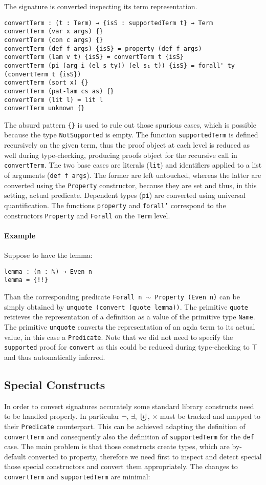 \documentclass[10pt,a4paper]{article}
\begin{document}
The signature is converted inspecting its term representation.
\begin{verbatim}
convertTerm : (t : Term) → {isS : supportedTerm t} → Term
convertTerm (var x args) {}
convertTerm (con c args) {}
convertTerm (def f args) {isS} = property (def f args)
convertTerm (lam v t) {isS} = convertTerm t {isS}
convertTerm (pi (arg i (el s ty)) (el s₁ t)) {isS} = forall' ty (convertTerm t {isS})
convertTerm (sort x) {}
convertTerm (pat-lam cs as) {}
convertTerm (lit l) = lit l
convertTerm unknown {}
\end{verbatim}
The absurd pattern \texttt{\{\}} is used to rule out those spurious cases, which is possible because the type \texttt{NotSupported} is empty.
The function \texttt{supportedTerm} is defined recursively on the given term, thus the proof object at each level is reduced as well during type-checking, producing proofs object for the recursive call in \texttt{convertTerm}. The two base cases are literals (\texttt{lit}) and identifiers applied to a list of arguments (\texttt{def f args}). The former are left untouched, whereas the latter are converted using the \texttt{Property} constructor, because they are set and thus, in this setting, actual predicate.
Dependent types (\texttt{pi}) are converted using universal quantification.
The functions \texttt{property} and \texttt{forall'} correspond to the constructors \texttt{Property} and \texttt{Forall} on the \texttt{Term} level.

\paragraph{Example}
Suppose to have the lemma:
\begin{verbatim}
lemma : (n : ℕ) → Even n
lemma = {!!}
\end{verbatim}
Than the corresponding predicate \texttt{Forall n $\sim$ Property (Even n)} can be simply obtained by \texttt{unquote (convert (quote lemma))}.
The primitive \texttt{quote} retrieves the representation of a definition as a value of the primitive type \texttt{Name}.
The primitive \texttt{unquote} converts the representation of an agda term to its actual value, in this case a \texttt{Predicate}. Note that we did not need to specify the \texttt{supported} proof for \texttt{convert} as this could be reduced during type-checking to \texttt{$\top$} and thus automatically inferred.

\subsection{Special Constructs}
In order to convert signatures accurately some standard library constructs need to be handled properly. In particular $\neg$, $\exists$, $\biguplus$, $\times$ must be tracked and mapped to their \texttt{Predicate} counterpart.
This can be achieved adapting the definition of \texttt{convertTerm} and consequently also the definition of \texttt{supportedTerm} for the \texttt{def} case. The main problem is that those constructs create types, which are by-default converted to property, therefore we need first to inspect and detect special those special constructors and convert them appropriately. The changes to \texttt{convertTerm} and \texttt{supportedTerm} are minimal:
\end{document}
